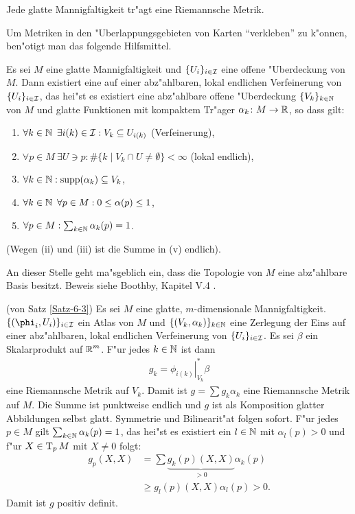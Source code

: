 \begin{Satz}\label{Satz-6-3}
  Jede glatte Mannigfaltigkeit tr"agt eine Riemannsche Metrik.
\end{Satz}

Um Metriken in den "Uberlappungsgebieten von Karten "`verkleben"' zu k"onnen, ben"otigt man das folgende Hilfsmittel.

\begin{satz}
  Es sei $M$ eine glatte Mannigfaltigkeit und $\{U_i\}_{i \in \operatorname{\mathcal{I}}}$ eine offene "Uberdeckung von $M$.
  Dann existiert eine  auf einer abz"ahlbaren, lokal endlichen Verfeinerung von $\{U_i\}_{i \in \operatorname{\mathcal{I}}}$, das hei"st es existiert eine abz"ahlbare offene "Uberdeckung $\{V_k\}_{k\in\operatorname{\mathbb{N}}}$ von $M$ und glatte Funktionen mit kompaktem Tr"ager $\alpha_k \colon M \to \operatorname{\mathbb{R}}$, so dass gilt:

  \begin{enumerate}[label=(\roman*)]
  \item $\forall k \in \operatorname{\mathbb{N}} \ \exists i(k) \in \operatorname{\mathcal{I}}: V_k \subseteq U_{i(k)}$ (Verfeinerung),
  \item $\forall p \in M \ \exists U \ni p: \# \{k \mid V_k \cap U \neq \emptyset \} < \infty$ (lokal endlich),
  \item $\forall k \in \operatorname{\mathbb{N}}: \operatorname{supp} (\alpha_k) \subseteq V_k$,
  \item $\forall k \in \operatorname{\mathbb{N}} \ \forall p \in M: 0 \leq \alpha(p) \leq 1$,
  \item $\forall p \in M: \sum_{k\in\operatorname{\mathbb{N}}}\alpha_k(p) = 1$.
  \end{enumerate}
  (Wegen (ii) und (iii) ist die Summe in (v) endlich).
\end{satz}
An dieser Stelle geht ma"sgeblich ein, dass die Topologie von $M$ eine abz"ahlbare Basis besitzt. Beweis siehe Boothby, Kapitel V.4 \cite{boothby1986introduction}.

\begin{bew}(von Satz \ref{Satz-6-3})
Es sei $M$ eine glatte, $m$-dimensionale Mannigfaltigkeit. $\{(\phi_i,U_i)\}_{i \in \calI}$ ein Atlas von $M$ und $\{(V_k,\alpha_k)\}_{k \in \operatorname{\mathbb{N}}}$ eine Zerlegung der Eins auf einer abz"ahlbaren, lokal endlichen Verfeinerung von $\{U_i\}_{i \in \operatorname{\mathcal{I}}}$. Es sei $\beta$ ein Skalarprodukt auf $\operatorname{\mathbb{R}}^m$. F"ur jedes $k \in \operatorname{\mathbb{N}}$ ist dann
\begin{align*}
	g_k = \left.\phi_{i(k)}\right|_{V_k}^{*}\beta
\end{align*}
eine Riemannsche Metrik auf $V_k$. Damit ist $g = \sum g_k\alpha_k$ eine Riemannsche Metrik auf $M$.
Die Summe ist punktweise endlich und $g$ ist als Komposition glatter Abbildungen selbst glatt.
Symmetrie und Bilinearit"at folgen sofort.
F"ur jedes $p \in M$ gilt $\sum_{k \in \operatorname{\mathbb{N}}}\alpha_k(p) = 1$, das hei"st es existiert ein $l \in \operatorname{\mathbb{N}}$ mit $\alpha_l(p) > 0$ und f"ur $X \in \operatorname{T}_pM$ mit $X \neq 0$ folgt:
\begin{align*}
	g_p(X,X) & = \sum \underbrace{g_k(p)(X,X)}_{> 0}\alpha_k(p)\\
	& \geq g_l(p)(X,X)\alpha_l(p) > 0.
\end{align*}
Damit ist $g$ positiv definit.
\end{bew}

